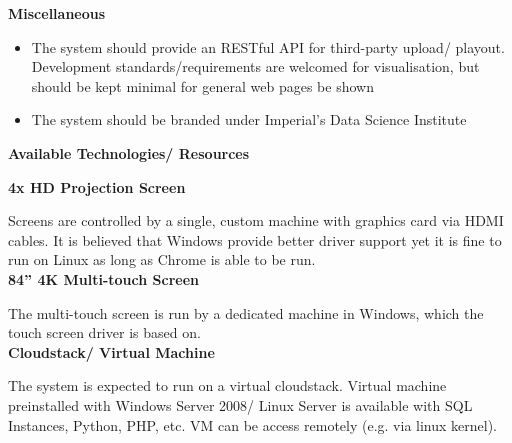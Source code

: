 \documentclass[a4paper, titlepage]{article}
\begin{document}
\textbf{\large Miscellaneous}

\begin{itemize}
\item The system should provide an RESTful API for third-party upload/ playout.
Development standards/requirements are welcomed for visualisation, but should be kept minimal for general web pages be shown
\item The system should be branded under Imperial’s Data Science Institute\\
\end{itemize}


\textbf{\Large Available Technologies/ Resources} \vspace{5pt}

\textbf{\large 4x HD Projection Screen}

Screens are controlled by a single, custom machine with graphics card via HDMI cables. It is believed that Windows provide better driver support yet it is fine to run on Linux as long as Chrome is able to be run.\\

\textbf{\large 84” 4K Multi-touch Screen}

The multi-touch screen is run by a dedicated machine in Windows, which the touch screen driver is based on.\\

\textbf{\large Cloudstack/ Virtual Machine}

The system is expected to run on a virtual cloudstack. Virtual machine preinstalled with Windows Server 2008/ Linux Server is available with SQL Instances, Python, PHP, etc. VM can be access remotely (e.g. via linux kernel).\\
\end{document}
